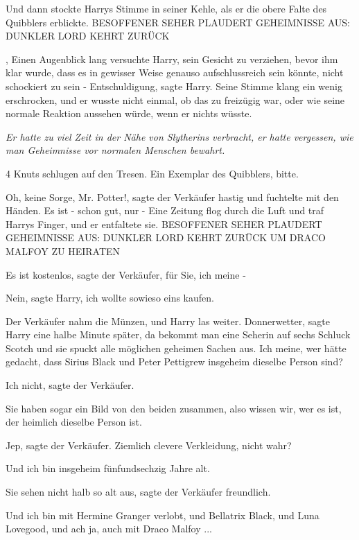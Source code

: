 Und dann stockte Harrys Stimme in seiner Kehle, als er die obere Falte des
Quibblers erblickte. BESOFFENER SEHER PLAUDERT GEHEIMNISSE AUS: DUNKLER LORD
KEHRT ZURÜCK

, Einen Augenblick lang versuchte Harry, sein Gesicht zu verziehen, bevor ihm
klar wurde, dass es in gewisser Weise genauso aufschlussreich sein könnte, nicht
schockiert zu sein - \glqq{}Entschuldigung\grqq{}, sagte Harry. Seine Stimme
klang ein wenig erschrocken, und er wusste nicht einmal, ob das zu freizügig
war, oder wie seine normale Reaktion aussehen würde, wenn er nichts wüsste.

\emph{Er hatte zu viel Zeit in der Nähe von Slytherins verbracht, er hatte
vergessen, wie man Geheimnisse vor normalen Menschen bewahrt.}

4 Knuts schlugen auf den Tresen. \glqq{}Ein Exemplar des Quibblers, bitte.\grqq{}

\glqq{}Oh, keine Sorge, Mr. Potter!\grqq{}, sagte der Verkäufer hastig und
fuchtelte mit den Händen. \glqq{}Es ist - schon gut, nur -\grqq{} Eine Zeitung flog
durch die Luft und traf Harrys Finger, und er entfaltete sie. BESOFFENER SEHER
PLAUDERT GEHEIMNISSE AUS: DUNKLER LORD KEHRT ZURÜCK UM DRACO MALFOY ZU HEIRATEN

\glqq{}Es ist kostenlos\grqq{}, sagte der Verkäufer, \glqq{}für Sie, ich meine
-\grqq{}

\glqq{}Nein\grqq{}, sagte Harry, \glqq{}ich wollte sowieso eins kaufen.\grqq{}

Der Verkäufer nahm die Münzen, und Harry las weiter. \glqq{}Donnerwetter\grqq{},
sagte Harry eine halbe Minute später, \glqq{}da bekommt man eine Seherin auf
sechs Schluck Scotch und sie spuckt alle möglichen geheimen Sachen aus. Ich
meine, wer hätte gedacht, dass Sirius Black und Peter Pettigrew insgeheim
dieselbe Person sind?\grqq{}

\glqq{}Ich nicht\grqq{}, sagte der Verkäufer.

\glqq{}Sie haben sogar ein Bild von den beiden zusammen, also wissen wir, wer es
ist, der heimlich dieselbe Person ist.\grqq{}

\glqq{}Jep\grqq{}, sagte der Verkäufer. \glqq{}Ziemlich clevere Verkleidung,
nicht wahr?\grqq{}

\glqq{}Und ich bin insgeheim fünfundsechzig Jahre alt.\grqq{}

\glqq{}Sie sehen nicht halb so alt aus\grqq{}, sagte der Verkäufer freundlich.

\glqq{}Und ich bin mit Hermine Granger verlobt, und Bellatrix Black, und Luna
Lovegood, und ach ja, auch mit Draco Malfoy ...\grqq{}

